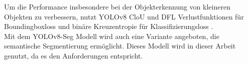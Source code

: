 {{	Um die Performance insbesondere bei der Objekterkennung von kleineren Objekten zu verbessern, nutzt YOLOv8 CloU \citep{Zheng2020} und DFL \citep{Li2020} Verlustfunktionen für Boundingboxloss und binäre Kreuzentropie für Klassifizierungsloss \citep{Terven2023}. \\

	Mit dem YOLOv8-Seg Modell wird auch eine Variante angeboten, die semantische Segmentierung ermöglicht. Dieses Modell wird in dieser Arbeit genutzt, da es den Anforderungen entspricht.
	}
}
